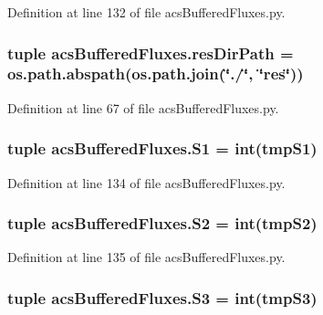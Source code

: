 Definition at line 132 of file acs\-Buffered\-Fluxes.\-py.

\hypertarget{a00098_abc625ab1aeed5741a02bbaccfbee5c06}{
\subsubsection[{res\-Dir\-Path}]{\setlength{\rightskip}{0pt plus 5cm}tuple acs\-Buffered\-Fluxes.\-res\-Dir\-Path = os.\-path.\-abspath(os.\-path.\-join(\char`\"{}./\char`\"{}, \char`\"{}res\char`\"{}))}}\label{a00098_abc625ab1aeed5741a02bbaccfbee5c06}


Definition at line 67 of file acs\-Buffered\-Fluxes.\-py.

\hypertarget{a00098_ab1521c41c4bbd4df7a741e0f58e760f1}{
\subsubsection[{S1}]{\setlength{\rightskip}{0pt plus 5cm}tuple acs\-Buffered\-Fluxes.\-S1 = int(tmp\-S1)}}\label{a00098_ab1521c41c4bbd4df7a741e0f58e760f1}


Definition at line 134 of file acs\-Buffered\-Fluxes.\-py.

\hypertarget{a00098_a812cd646e9a7a994e7ec3eae8c2371f4}{
\subsubsection[{S2}]{\setlength{\rightskip}{0pt plus 5cm}tuple acs\-Buffered\-Fluxes.\-S2 = int(tmp\-S2)}}\label{a00098_a812cd646e9a7a994e7ec3eae8c2371f4}


Definition at line 135 of file acs\-Buffered\-Fluxes.\-py.

\hypertarget{a00098_ad28d690663b4722db331f9046d80d16c}{
\subsubsection[{S3}]{\setlength{\rightskip}{0pt plus 5cm}tuple acs\-Buffered\-Fluxes.\-S3 = int(tmp\-S3)}}\label{a00098_ad28d690663b4722db331f9046d80d16c}


